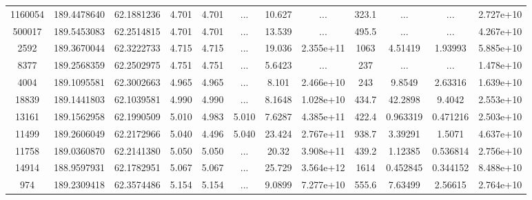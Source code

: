 \begin{table*}
\begin{tabular}{cccccccccccc}
        1160054 &     189.4478640 &      62.1881236 &           4.701 &           4.701 &             ... &          10.627 &             ... &           323.1 &             ... &             ... &       2.727e+10 \\
         500017 &     189.5453083 &      62.2514815 &           4.701 &           4.701 &             ... &          13.539 &             ... &           495.5 &             ... &             ... &       4.267e+10 \\
           2592 &     189.3670044 &      62.3222733 &           4.715 &           4.715 &             ... &          19.036 &       2.355e+11 &            1063 &         4.51419 &         1.93993 &       5.885e+10 \\
           8377 &     189.2568359 &      62.2502975 &           4.751 &           4.751 &             ... &          5.6423 &             ... &             237 &             ... &             ... &       1.478e+10 \\
           4004 &     189.1095581 &      62.3002663 &           4.965 &           4.965 &             ... &           8.101 &       2.466e+10 &             243 &          9.8549 &         2.63316 &       1.639e+10 \\
          18839 &     189.1441803 &      62.1039581 &           4.990 &           4.990 &             ... &          8.1648 &       1.028e+10 &           434.7 &         42.2898 &          9.4042 &       2.553e+10 \\
          13161 &     189.1562958 &      62.1990509 &           5.010 &           4.983 &           5.010 &          7.6287 &       4.385e+11 &           422.4 &        0.963319 &        0.471216 &       2.503e+10 \\
          11499 &     189.2606049 &      62.2172966 &           5.040 &           4.496 &           5.040 &          23.424 &       2.767e+11 &           938.7 &         3.39291 &          1.5071 &       4.637e+10 \\
          11758 &     189.0360870 &      62.2141380 &           5.050 &           5.050 &             ... &           20.32 &       3.908e+11 &           439.2 &         1.12385 &        0.536814 &       2.756e+10 \\
          14914 &     188.9597931 &      62.1782951 &           5.067 &           5.067 &             ... &          25.729 &       3.564e+12 &            1614 &        0.452845 &        0.344152 &       8.488e+10 \\
            974 &     189.2309418 &      62.3574486 &           5.154 &           5.154 &             ... &          9.0899 &       7.277e+10 &           555.6 &         7.63499 &         2.56615 &       2.764e+10 \\

\end{tabular}
\end{table*}
